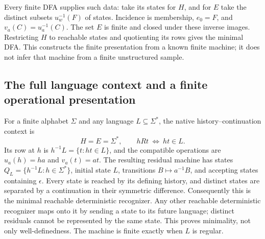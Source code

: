 \documentclass[11pt]{article}
\theoremstyle{remark}
\begin{document}
Every finite DFA supplies such data: take its states for $H$, and for $E$
take the distinct subsets $u_w^{-1}(F)$ of states. Incidence is membership,
$e_0=F$, and $v_a(C)=u_a^{-1}(C)$. The set $E$ is finite and closed under
these inverse images. Restricting $H$ to reachable states and quotienting
its rows gives the minimal DFA. This constructs the finite presentation
from a known finite machine; it does not infer that machine from a finite
unstructured sample.


\subsection{The full language context and a finite operational presentation}
For a finite alphabet $\Sigma$ and any language $L\subseteq\Sigma^*$, the native
history--continuation context is
\[
 H=E=\Sigma^*,\qquad hRt\ \Longleftrightarrow\ ht\in L.
\]
Its row at $h$ is $h^{-1}L=\{t:ht\in L\}$, and the compatible operations
are $u_a(h)=ha$ and $v_a(t)=at$. The resulting residual machine has states
$Q_L=\{h^{-1}L:h\in\Sigma^*\}$, initial state $L$, transitions
$B\mapsto a^{-1}B$, and accepting states containing $\epsilon$.
Every state is reached by its defining history, and distinct states are
separated by a continuation in their symmetric difference. Consequently
this is the minimal reachable deterministic recognizer. Any other
reachable deterministic recognizer maps onto it by sending a state to its
future language; distinct residuals cannot be represented by the same state.
This proves minimality, not only well-definedness. The machine is finite
exactly when $L$ is regular.
\end{document}
